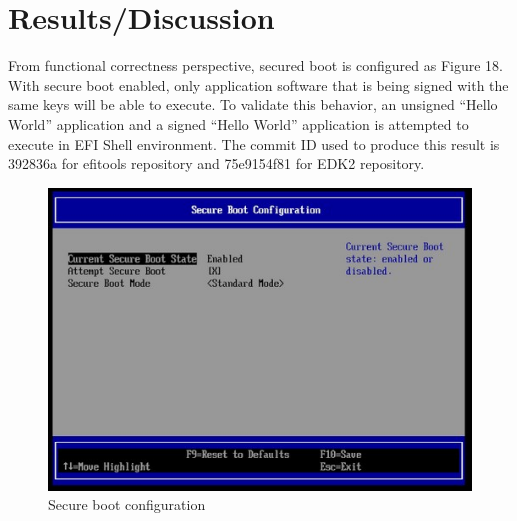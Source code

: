 \documentclass[]{rsos}%
\begin{document}
\section{ Results/Discussion}
From functional correctness perspective, secured boot is configured as Figure 18. With secure boot enabled, only application software that is being signed with the same keys will be able to execute. To validate this behavior, an unsigned “Hello World” application and a signed “Hello World” application is attempted to execute in EFI Shell environment. The commit ID used to produce this result is 392836a for efitools repository and 75e9154f81 for EDK2 repository.

\begin{figure}[hbt!]
	\centering
	\includegraphics[width=1\textwidth]{figs/SecureBootConfiguration.JPG}
	\caption{Secure boot configuration}
\end{figure}
\end{document}
